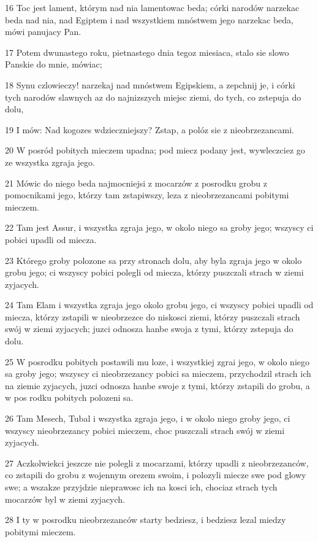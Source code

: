 \par 16 Toc jest lament, którym nad nia lamentowac beda; córki narodów narzekac beda nad nia, nad Egiptem i nad wszystkiem mnóstwem jego narzekac beda, mówi panujacy Pan.
\par 17 Potem dwunastego roku, pietnastego dnia tegoz miesiaca, stalo sie slowo Panskie do mnie, mówiac;
\par 18 Synu czlowieczy! narzekaj nad mnóstwem Egipskiem, a zepchnij je, i córki tych narodów slawnych az do najnizszych miejsc ziemi, do tych, co zstepuja do dolu,
\par 19 I mów: Nad kogozes wdzieczniejszy? Zstap, a polóz sie z nieobrzezancami.
\par 20 W posród pobitych mieczem upadna; pod miecz podany jest, wywleczciez go ze wszystka zgraja jego.
\par 21 Mówic do niego beda najmocniejsi z mocarzów z posrodku grobu z pomocnikami jego, którzy tam zstapiwszy, leza z nieobrzezancami pobitymi mieczem.
\par 22 Tam jest Assur, i wszystka zgraja jego, w okolo niego sa groby jego; wszyscy ci pobici upadli od miecza.
\par 23 Którego groby polozone sa przy stronach dolu, aby byla zgraja jego w okolo grobu jego; ci wszyscy pobici polegli od miecza, którzy puszczali strach w ziemi zyjacych.
\par 24 Tam Elam i wszystka zgraja jego okolo grobu jego, ci wszyscy pobici upadli od miecza, którzy zstapili w nieobrzezce do niskosci ziemi, którzy puszczali strach swój w ziemi zyjacych; juzci odnosza hanbe swoja z tymi, którzy zstepuja do dolu.
\par 25 W posrodku pobitych postawili mu loze, i wszystkiej zgrai jego, w okolo niego sa groby jego; wszyscy ci nieobrzezancy pobici sa mieczem, przychodzil strach ich na ziemie zyjacych, juzci odnosza hanbe swoje z tymi, którzy zstapili do grobu, a w pos rodku pobitych polozeni sa.
\par 26 Tam Mesech, Tubal i wszystka zgraja jego, i w okolo niego groby jego, ci wszyscy nieobrzezancy pobici mieczem, choc puszczali strach swój w ziemi zyjacych.
\par 27 Aczkolwiekci jeszcze nie polegli z mocarzami, którzy upadli z nieobrzezanców, co zstapili do grobu z wojennym orezem swoim, i polozyli miecze swe pod glowy swe; a wszakze przyjdzie nieprawosc ich na kosci ich, chociaz strach tych mocarzów byl w ziemi zyjacych.
\par 28 I ty w posrodku nieobrzezanców starty bedziesz, i bedziesz lezal miedzy pobitymi mieczem.
